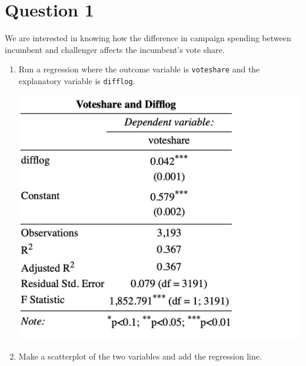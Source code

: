 \documentclass[12pt,letterpaper]{article}
\begin{document}
\section*{Question 1}
\vspace{.25cm}
\noindent We are interested in knowing how the difference in campaign spending between incumbent and challenger affects the incumbent's vote share. 
	\begin{enumerate}
		\item Run a regression where the outcome variable is \texttt{voteshare} and the explanatory variable is \texttt{difflog}.	\vspace{5cm}
		
			 
			\includegraphics[width=1.0\textwidth]{model_1.jpg}
			
		\item Make a scatterplot of the two variables and add the regression line. 	
			\vspace{.5cm}
			

\end{enumerate}
\end{document}
